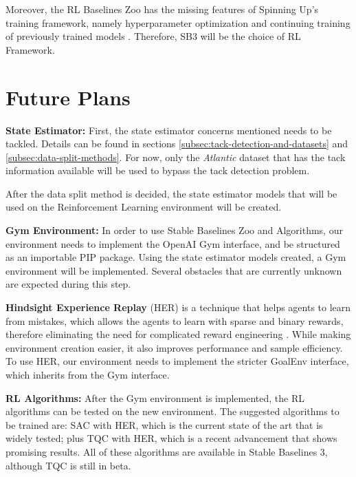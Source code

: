 Moreover, the RL Baselines Zoo has the missing features of Spinning Up's training framework, namely hyperparameter optimization and continuing training of previously trained models \cite{rl-zoo3}. Therefore, SB3 will be the choice of RL Framework.

\section{Future Plans}

\qquad\textbf{State Estimator:} 
First, the state estimator concerns mentioned needs to be tackled. Details can be found in sections \ref{subsec:tack-detection-and-datasets} and \ref{subsec:data-split-methods}. For now, only the \emph{Atlantic} dataset that has the tack information available will be used to bypass the tack detection problem.

After the data split method is decided, the state estimator models that will be used on the Reinforcement Learning environment will be created.

\textbf{Gym Environment:}
In order to use Stable Baselines Zoo and Algorithms, our environment needs to implement the OpenAI Gym interface, and be structured as an importable PIP package. Using the state estimator models created, a Gym environment will be implemented. Several obstacles that are currently unknown are expected during this step.

\textbf{Hindsight Experience Replay}
(HER) is a technique that helps agents to learn from mistakes, which allows the agents to learn with sparse and binary rewards, therefore eliminating the need for complicated reward engineering \cite{her-paper}. While making environment creation easier, it also improves performance and sample efficiency. To use HER, our environment needs to implement the stricter GoalEnv interface, which inherits from the Gym interface.

\textbf{RL Algorithms:}
After the Gym environment is implemented, the RL algorithms can be tested on the new environment. The suggested algorithms to be trained are: SAC with HER, which is the current state of the art that is widely tested; plus TQC with HER, which is a recent advancement that shows promising results. All of these algorithms are available in Stable Baselines 3, although TQC is still in beta.

